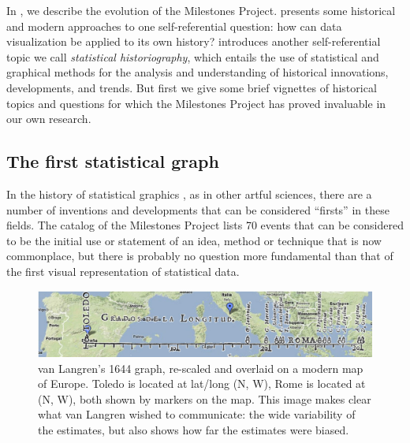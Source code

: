 In , we describe the evolution of the Milestones Project. 
presents some historical and modern approaches to one self-referential question: how can data
visualization be applied to its own history?  introduces another self-referential
topic we
call \emph{statistical historiography},
which entails the use of statistical and graphical methods for the analysis and understanding of historical innovations, developments, and trends.
But first we give some brief vignettes of historical topics and questions for which the Milestones Project has
proved invaluable in our own research.

\subsection{The first statistical graph}
In the history of statistical graphics \citep{Friendly:06:hbook},
as in other artful sciences, there are a number of inventions and developments
that can be considered ``firsts'' in these fields.
The catalog of the Milestones Project
\citep{FriendlyDenis:01} lists 70 events that can be considered to be the
initial use or statement of an idea, method or technique that is now
commonplace, but there is probably no question more fundamental than
that of the first visual representation of statistical data.

\begin{figure}[htb]
 \centering
 \includegraphics[width=\textwidth]{fig/langren-google-overlay}
 \caption{van Langren's 1644 graph, re-scaled and overlaid on a modern map of Europe.
 Toledo is located at
lat/long
(N, W), Rome is located at (N, W),
both shown by markers on the map.  This image makes clear what van Langren wished to communicate:
the wide variability of the estimates, but also shows how far the estimates were biased.}%
  \label{fig:langren-google-overlay}
\end{figure}

